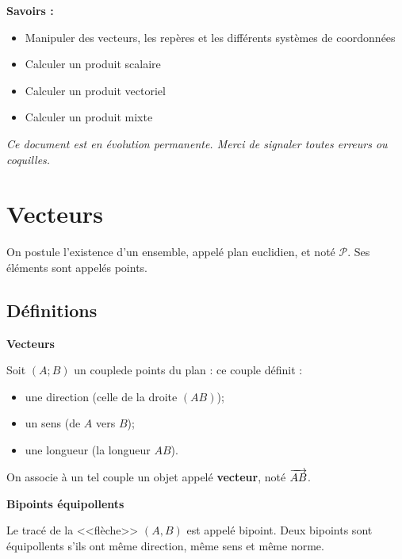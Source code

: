 \documentclass[10pt,oneside]{article}
\begin{document}
\begin{savoir}
\textbf{Savoirs :}
\begin{itemize}
\item Manipuler des vecteurs, les repères et les différents systèmes de coordonnées
\item Calculer un produit scalaire
\item Calculer un produit vectoriel
\item Calculer un produit mixte
\end{itemize}
\end{savoir}

\setlength{\parskip}{0ex plus 0.2ex minus 0ex}
 \renewcommand{\contentsname}{}
 \renewcommand{\baselinestretch}{1}

\textit{Ce document est en évolution permanente. Merci de signaler toutes
erreurs ou coquilles.}

\tableofcontents

 \renewcommand{\baselinestretch}{1.2}
\setlength{\parskip}{2ex plus 0.5ex minus 0.2ex}



\section{Vecteurs}
On postule l'existence d'un ensemble, appelé plan euclidien, et noté $\mathcal{P}$. Ses éléments sont appelés points.
\subsection{Définitions}
\begin{defi}
\textbf{Vecteurs}

Soit $(A;B)$ un couple\footnotemark[1] de points du plan : ce couple définit :
\begin{itemize}
\item une direction (celle de la droite $(AB)$);
\item un sens (de $A$ vers $B$);
\item une longueur (la longueur $AB$).
\end{itemize}

On associe à un tel couple un objet appelé \textbf{vecteur}, noté $\overrightarrow{AB}$.
\end{defi}


\begin{rem}
\textbf{Bipoints équipollents}

Le tracé de la <<flèche>> $(A,B)$ est appelé bipoint. Deux bipoints sont équipollents s'ils ont même direction, même sens et même norme. 
\end{rem}
\end{document}
